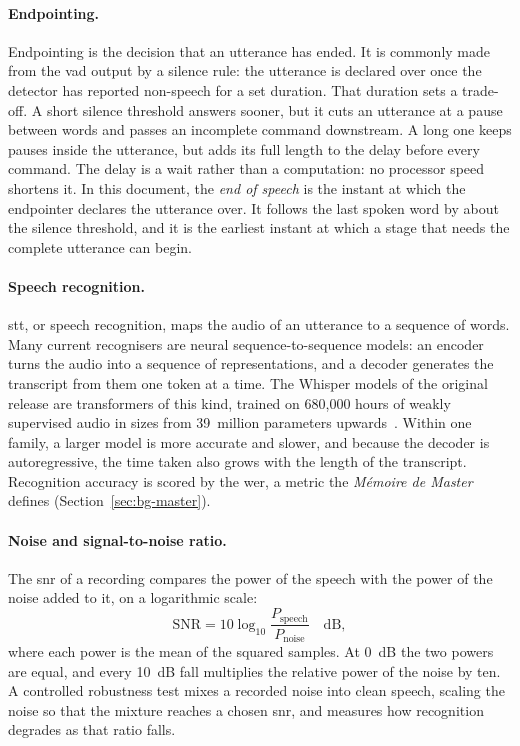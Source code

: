 \paragraph{Endpointing.} Endpointing is the decision that an utterance has ended. It is commonly
made from the \gls{vad} output by a silence rule: the utterance is declared over once the detector
has reported non-speech for a set duration. That duration sets a trade-off. A short silence
threshold answers sooner, but it cuts an utterance at a pause between words and passes an incomplete
command downstream. A long one keeps pauses inside the utterance, but adds its full length to the
delay before every command. The delay is a wait rather than a computation: no processor speed
shortens it. In this document, the \emph{end of speech} is the instant at which the endpointer
declares the utterance over. It follows the last spoken word by about the silence threshold, and it
is the earliest instant at which a stage that needs the complete utterance can begin.

\paragraph{Speech recognition.} \Gls{stt}, or speech recognition, maps the audio of an utterance to
a sequence of words. Many current recognisers are neural sequence-to-sequence models: an encoder
turns the audio into a sequence of representations, and a decoder generates the transcript from them
one token at a time. The Whisper models of the original release are transformers of this kind,
trained on 680{,}000 hours of weakly supervised audio in sizes from 39~million parameters
upwards~\cite{whisper}. Within one family, a larger model is more accurate and slower, and because
the decoder is autoregressive, the time taken also grows with the length of the transcript.
Recognition accuracy is scored by the \gls{wer}, a metric the \emph{M\'emoire de Master} defines
(Section~\ref{sec:bg-master}).

\paragraph{Noise and signal-to-noise ratio.} The \gls{snr} of a recording compares the power of
the speech with the power of the noise added to it, on a logarithmic scale:
\begin{equation}
  \label{eq:snr}
  \mathrm{SNR} = 10 \log_{10} \frac{P_{\mathrm{speech}}}{P_{\mathrm{noise}}} \quad \text{dB},
\end{equation}
where each power is the mean of the squared samples. At 0~dB the two powers are equal, and every
10~dB fall multiplies the relative power of the noise by ten. A controlled robustness test mixes a
recorded noise into clean speech, scaling the noise so that the mixture reaches a chosen \gls{snr},
and measures how recognition degrades as that ratio falls.

